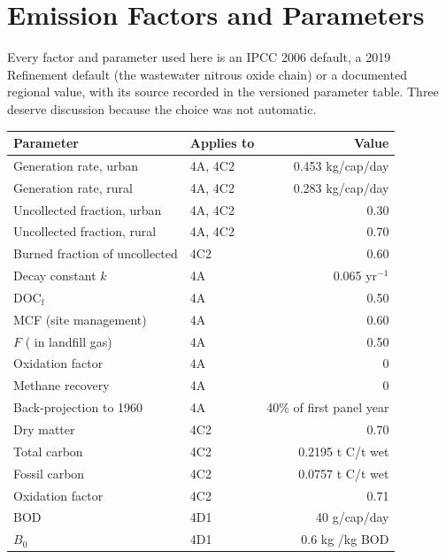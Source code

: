 \section{Emission Factors and Parameters}
\label{sec:factors}

Every factor and parameter used here is an IPCC 2006 default, a 2019 Refinement default
(the wastewater nitrous oxide chain) or a documented regional value,
with its source recorded in the versioned parameter table. Three deserve discussion because
the choice was not automatic.

\begin{table}[htbp]
\centering
\footnotesize
\begin{tabular}{@{}llr@{}}
\toprule
\textbf{Parameter} & \textbf{Applies to} & \textbf{Value} \\
\midrule
Generation rate, urban    & 4A, 4C2 & \SI{0.453}{} kg/cap/day \\
Generation rate, rural    & 4A, 4C2 & \SI{0.283}{} kg/cap/day \\
Uncollected fraction, urban & 4A, 4C2 & 0.30 \\
Uncollected fraction, rural & 4A, 4C2 & 0.70 \\
Burned fraction of uncollected & 4C2 & 0.60 \\
\midrule
Decay constant $k$        & 4A  & 0.065 yr$^{-1}$ \\
$\mathrm{DOC_f}$          & 4A  & 0.50 \\
MCF (site management)     & 4A  & 0.60 \\
$F$ (\CHfour{} in landfill gas) & 4A & 0.50 \\
Oxidation factor          & 4A  & 0 \\
Methane recovery          & 4A  & 0 \\
Back-projection to 1960   & 4A  & 40\% of first panel year \\
\midrule
Dry matter                & 4C2 & 0.70 \\
Total carbon              & 4C2 & \SI{0.2195}{} t C/t wet \\
Fossil carbon             & 4C2 & \SI{0.0757}{} t C/t wet \\
Oxidation factor          & 4C2 & 0.71 \\
\midrule
BOD                       & 4D1 & \SI{40}{} g/cap/day \\
$B_0$                     & 4D1 & \SI{0.6}{} kg \CHfour{}/kg BOD \\

\end{tabular}
\end{table}
